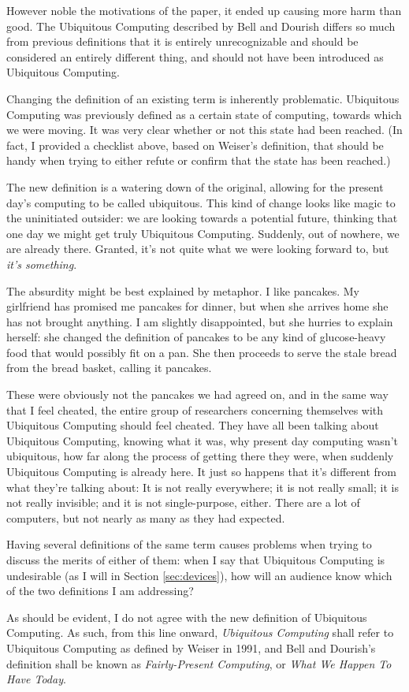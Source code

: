 However noble the motivations of the paper, it ended up causing more harm than good. The Ubiquitous Computing described
by Bell and Dourish differs so much from previous definitions that it is entirely unrecognizable and should be considered
an entirely different thing, and should not have been introduced as Ubiquitous Computing.

Changing the definition of an existing term is inherently problematic. Ubiquitous Computing was previously defined
as a certain state of computing, towards which we were moving. It was very clear whether or not this state had been
reached. (In fact, I provided a checklist above, based on Weiser's definition, that should be handy when trying to
either refute or confirm that the state has been reached.)

The new definition is a watering down of the original, allowing for the present day's computing to be called ubiquitous.
This kind of change looks like magic to the uninitiated outsider: we are looking towards a potential future,
thinking that one day we might get truly Ubiquitous Computing. Suddenly, out of nowhere, we are already there.
Granted, it's not quite what we were looking forward to, but \emph{it's something}.

The absurdity might be best explained by metaphor. I like pancakes. My girlfriend has promised me pancakes for dinner,
but when she arrives home she has not brought anything. I am slightly disappointed, but she hurries to explain
herself: she changed the definition of pancakes to be any kind of glucose-heavy food that would possibly fit on a pan.
She then proceeds to serve the stale bread from the bread basket, calling it pancakes.

These were obviously not the pancakes we had agreed on, and in the same way that I feel cheated, the entire group of researchers concerning
themselves with Ubiquitous Computing should feel cheated. They have all been talking about Ubiquitous Computing, knowing
what it was, why present day computing wasn't ubiquitous, how far along the process of getting there they were, when suddenly
Ubiquitous Computing is already here. It just so happens that it's different from what they're talking about: It is
not really everywhere; it is not really small; it is not really invisible; and it is not single-purpose, either. There are
a lot of computers, but not nearly as many as they had expected.

Having several definitions of the same term causes problems when trying to discuss the merits of either of them: when I say
that Ubiquitous Computing is undesirable (as I will in Section \ref{sec:devices}), how will
an audience know which of the two definitions I am addressing?

As should be evident, I do not agree with the new definition of Ubiquitous Computing. As such, from this line onward,
\emph{Ubiquitous Computing} shall refer to Ubiquitous Computing as defined by Weiser in 1991, and Bell and Dourish's
definition shall be known as \emph{Fairly-Present Computing}, or \emph{What We Happen To Have Today}.